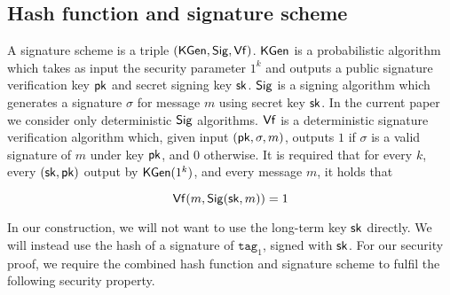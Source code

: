 \documentclass{article}
\begin{document}





\subsection{Hash function and signature scheme}
A signature scheme is a triple $(\mathsf{KGen}, \mathsf{Sig}, \mathsf{Vf})$. $\mathsf{KGen}$ is a probabilistic algorithm which takes as input the security parameter $1^k$ and outputs a public signature verification key $\mathsf{pk}$ and secret signing key $\mathsf{sk}$. $\mathsf{Sig}$ is a signing algorithm which generates a signature $\sigma$ for message $m$ using secret key $\mathsf{sk}$. In the current paper we consider only deterministic $\mathsf{Sig}$ algorithms. $\mathsf{Vf}$ is a deterministic signature verification algorithm which, given input $(\mathsf{pk}, \sigma, m)$, outputs $1$ if $\sigma$ is a valid signature of $m$ under key $\mathsf{pk}$, and $0$ otherwise. It is required that for every $k$, every $(\mathsf{sk}, \mathsf{pk})$ output by $\mathsf{KGen} (1^k)$, and every message $m$, it holds that

$$\mathsf{Vf} (m , \mathsf{Sig} ({\mathsf{sk}, m})) = 1$$

In our construction, we will not want to use the long-term key $\mathsf{sk}$ directly. We will instead use the hash of a signature of $\texttt{tag}_1$, signed with $\mathsf{sk}$. For our security proof, we require the combined hash function and signature scheme to fulfil the following  security property.
\end{document}
